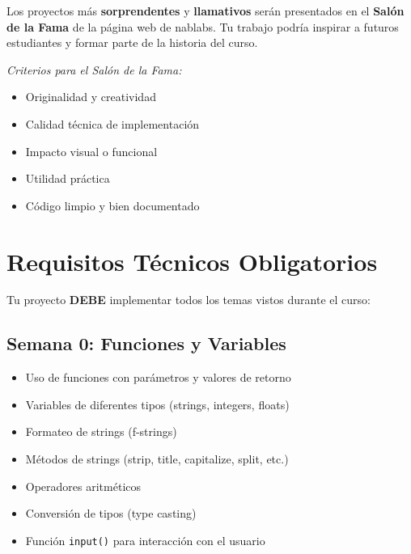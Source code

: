 \documentclass[12pt,a4paper]{article}
\begin{document}
\begin{tcolorbox}[colback=nagreen!5!white,colframe=nagreen,title=\textbf{¡Oportunidad Especial!}]
Los proyectos más \textbf{sorprendentes} y \textbf{llamativos} serán presentados en el \textbf{Salón de la Fama} de la página web de nablabs. Tu trabajo podría inspirar a futuros estudiantes y formar parte de la historia del curso.

\vspace{0.5em}
\textit{Criterios para el Salón de la Fama:}
\begin{itemize}
    \item Originalidad y creatividad
    \item Calidad técnica de implementación
    \item Impacto visual o funcional
    \item Utilidad práctica
    \item Código limpio y bien documentado
\end{itemize}
\end{tcolorbox}

\section{Requisitos Técnicos Obligatorios}

Tu proyecto \textbf{DEBE} implementar todos los temas vistos durante el curso:

\subsection{Semana 0: Funciones y Variables}
\begin{itemize}
    \item Uso de funciones con parámetros y valores de retorno
    \item Variables de diferentes tipos (strings, integers, floats)
    \item Formateo de strings (f-strings)
    \item Métodos de strings (strip, title, capitalize, split, etc.)
    \item Operadores aritméticos
    \item Conversión de tipos (type casting)
    \item Función \texttt{input()} para interacción con el usuario
\end{itemize}
\end{document}
